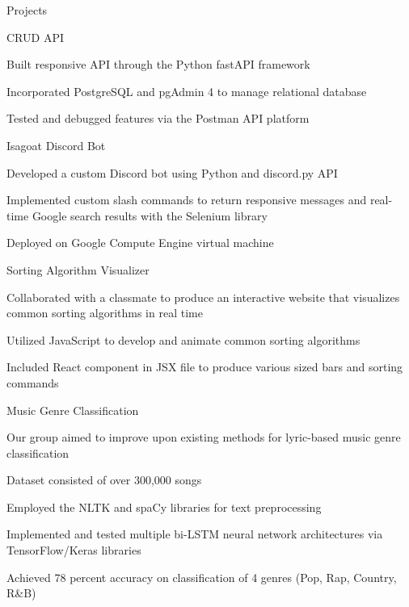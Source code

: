 \documentclass{resume}
\begin{document}
\begin{rSection}{Projects}
\begin{rSubsection}{CRUD API}{}{}{}
 \item Built responsive API through the Python fastAPI framework
 \item Incorporated PostgreSQL and pgAdmin 4 to manage relational database
 \item Tested and debugged features via the Postman API platform
\end{rSubsection}
\begin{rSubsection}{Isagoat Discord Bot}{}{}{}
 \item Developed a custom Discord bot using Python and discord.py API
 \item Implemented custom slash commands to return responsive messages and real-time Google search results with the Selenium library
 \item Deployed on Google Compute Engine virtual machine

\end{rSubsection}
\begin{rSubsection}{Sorting Algorithm Visualizer}{}{}{}
 \item Collaborated with a classmate to produce an interactive website that visualizes common sorting algorithms in real time
 \item  Utilized JavaScript to develop and animate common sorting algorithms
 \item Included React component in JSX file to produce various sized bars and sorting commands
\end{rSubsection}

\begin{rSubsection}{Music Genre Classification}{}{}{}
 \item Our group aimed to improve upon existing methods for lyric-based music genre classification
 \item Dataset consisted of over 300,000 songs
  \item Employed the NLTK and spaCy libraries for text preprocessing
  \item Implemented and tested multiple bi-LSTM neural network architectures via TensorFlow/Keras libraries
  \item Achieved 78 percent accuracy on classification of 4 genres (Pop, Rap, Country, R\&B)

\end{rSubsection}
\end{rSection}
\end{document}
